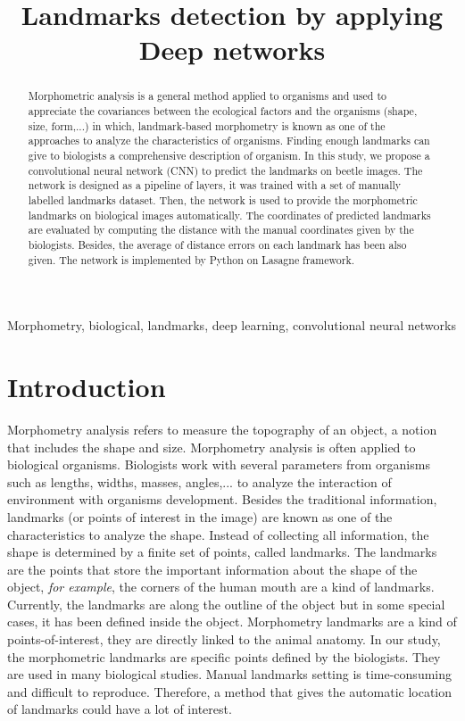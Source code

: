 \documentclass[conference]{IEEEtran}
\begin{document}
\title{Landmarks detection by applying Deep networks}

\maketitle

\begin{abstract}
Morphometric analysis is a general method applied to organisms and used to appreciate the covariances between the ecological factors and the organisms (shape, size, form,...) in which, landmark-based morphometry is known as one of the approaches to analyze the characteristics of organisms. Finding enough landmarks can give to biologists a comprehensive description of organism. In this study, we propose a convolutional neural network (CNN) to predict the landmarks on beetle images. The network is designed as a pipeline of layers, it was trained with a set of manually labelled landmarks dataset. Then, the network is used to provide the morphometric landmarks on biological images automatically. The coordinates of predicted landmarks are evaluated by computing the distance with the manual coordinates given by the biologists. Besides, the average of distance errors on each
landmark has been also given. The network is implemented by Python on Lasagne framework.
\end{abstract}

\begin{IEEEkeywords}
Morphometry, biological, landmarks, deep learning, convolutional neural networks
\end{IEEEkeywords}

\section{Introduction}
Morphometry analysis refers to measure the topography of an object, a notion that includes the shape and size. Morphometry analysis is often applied to biological organisms. Biologists work with several parameters from organisms such as lengths, widths, masses, angles,... to analyze the interaction of environment with organisms development. Besides the traditional information, landmarks (or points of interest in the image) are known as one of the characteristics to analyze the shape. Instead of collecting all information, the shape is determined by a finite set of points, called landmarks. The landmarks are the points that store the important information about the shape of the object, \textit{for example}, the corners of the human mouth are a kind of landmarks. Currently, the landmarks are along the outline of the object but in some special cases, it has been defined inside the object. Morphometry landmarks are a kind of points-of-interest, they are directly linked to the animal anatomy. In our study, the morphometric landmarks are specific points defined by the biologists. They are used in many biological studies. Manual landmarks setting is time-consuming and difficult to reproduce. Therefore, a method that gives the automatic location of landmarks could have a lot of interest.
\end{document}
